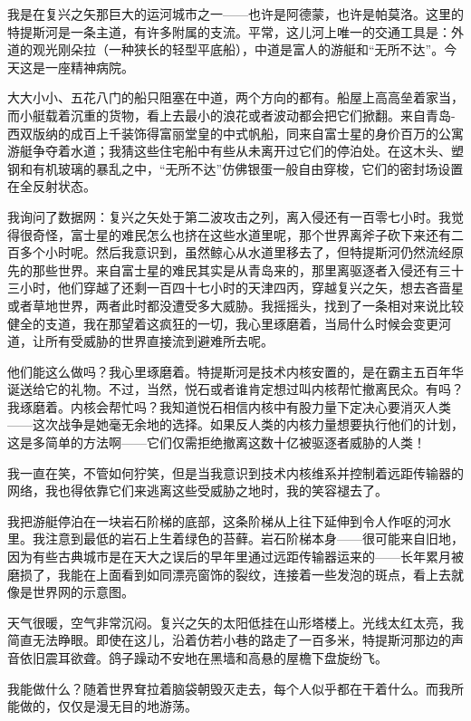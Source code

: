 \documentclass[AutoFakeBold=true]{book}
\begin{document}
我是在复兴之矢那巨大的运河城市之一——也许是阿德蒙，也许是帕莫洛。这里的特提斯河是一条主道，有许多附属的支流。平常，这儿河上唯一的交通工具是：外道的观光刚朵拉（一种狭长的轻型平底船），中道是富人的游艇和``无所不达''。今天这是一座精神病院。

大大小小、五花八门的船只阻塞在中道，两个方向的都有。船屋上高高垒着家当，而小艇载着沉重的货物，看上去最小的浪花或者波动都会把它们掀翻。来自青岛-西双版纳的成百上千装饰得富丽堂皇的中式帆船，同来自富士星的身价百万的公寓游艇争夺着水道；我猜这些住宅船中有些从未离开过它们的停泊处。在这木头、塑钢和有机玻璃的暴乱之中，``无所不达''仿佛银蛋一般自由穿梭，它们的密封场设置在全反射状态。

我询问了数据网：复兴之矢处于第二波攻击之列，离入侵还有一百零七小时。我觉得很奇怪，富士星的难民怎么也挤在这些水道里呢，那个世界离斧子砍下来还有二百多个小时呢。然后我意识到，虽然鲸心从水道里移去了，但特提斯河仍然流经原先的那些世界。来自富士星的难民其实是从青岛来的，那里离驱逐者入侵还有三十三小时，他们穿越了还剩一百四十七小时的天津四丙，穿越复兴之矢，想去吝啬星或者草地世界，两者此时都没遭受多大威胁。我摇摇头，找到了一条相对来说比较健全的支道，我在那望着这疯狂的一切，我心里琢磨着，当局什么时候会变更河道，让所有受威胁的世界直接流到避难所去呢。

{\kaishu 他们能这么做吗？}我心里琢磨着。特提斯河是技术内核安置的，是在霸主五百年华诞送给它的礼物。不过，当然，悦石或者谁肯定想过叫内核帮忙撤离民众。{\kaishu 有吗？}我琢磨着。内核会帮忙吗？我知道悦石相信内核中有股力量下定决心要消灭人类——这次战争是她毫无余地的选择。如果反人类的内核力量想要执行他们的计划，这是多简单的方法啊——它们仅需拒绝撤离这数十亿被驱逐者威胁的人类！

我一直在笑，不管如何狞笑，但是当我意识到技术内核维系并控制着远距传输器的网络，我也得依靠它们来逃离这些受威胁之地时，我的笑容褪去了。

我把游艇停泊在一块岩石阶梯的底部，这条阶梯从上往下延伸到令人作呕的河水里。我注意到最低的岩石上生着绿色的苔藓。岩石阶梯本身——很可能来自旧地，因为有些古典城市是在天大之误后的早年里通过远距传输器运来的——长年累月被磨损了，我能在上面看到如同漂亮窗饰的裂纹，连接着一些发泡的斑点，看上去就像是世界网的示意图。

天气很暖，空气非常沉闷。复兴之矢的太阳低挂在山形塔楼上。光线太红太亮，我简直无法睁眼。即使在这儿，沿着仿若小巷的路走了一百多米，特提斯河那边的声音依旧震耳欲聋。鸽子躁动不安地在黑墙和高悬的屋檐下盘旋纷飞。

{\kaishu 我能做什么？}随着世界耷拉着脑袋朝毁灭走去，每个人似乎都在干着什么。而我所能做的，仅仅是漫无目的地游荡。
\end{document}
